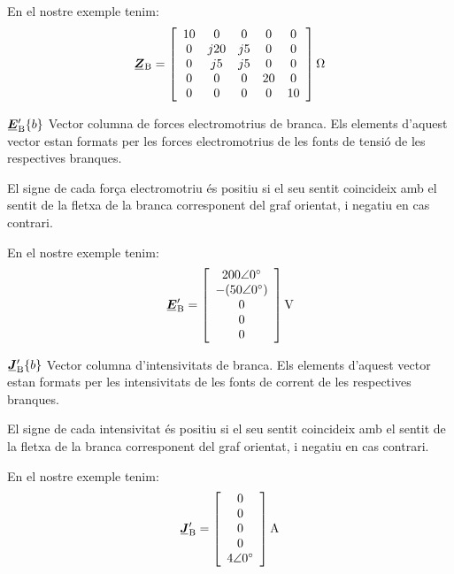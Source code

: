 \begin{list}{}
   En el nostre exemple tenim:
   \[
      \mcmplx{Z}\ped{B} = 
      \begin{bmatrix}\begin{array}{ccccc} 
            10 & 0 & 0 & 0 & 0 \\
            0 & j 20 & j 5 & 0 & 0 \\
            0 & j 5 & j 5 & 0 & 0 \\
            0 & 0 & 0 & 20 & 0 \\
            0 & 0 & 0 & 0 & 10
      \end{array}\end{bmatrix}\unit{\ohm}
   \]

   \item[$\mcmplx{E}'\ped{B}\{b\}$] Vector columna de forces electromotrius de branca. Els elements d'aquest vector estan formats per les forces electromotrius de les fonts de tensió de les respectives branques.

El signe de cada força electromotriu és positiu si el seu sentit coincideix amb el sentit de la fletxa de la branca corresponent del graf orientat, i negatiu en cas contrari.

   En el nostre exemple tenim:
   \[
      \mcmplx{E}'\ped{B} = 
      \begin{bmatrix}\begin{array}{c}  
      	\complexnum{200:0} \\ -(\complexnum{50:0}) \\ 0 \\ 0 \\ 0 
      \end{array}\end{bmatrix}\unit{V}
   \]

   \item[$\mcmplx{J}'\ped{B}\{b\}$]  Vector columna d'intensivitats de branca. Els elements d'aquest vector estan formats per les intensivitats de les fonts de corrent de les respectives branques.

El signe de cada intensivitat és positiu si el seu sentit coincideix amb el sentit de la fletxa de la branca corresponent del graf orientat, i negatiu en cas contrari.

   En el nostre exemple tenim:
   \[
      \mcmplx{J}'\ped{B} = 
      \begin{bmatrix}\begin{array}{c}  
      	0 \\ 0 \\ 0 \\ 0 \\ \complexnum{4:0} 
      \end{array}\end{bmatrix}\unit{A}
   \]

\end{list}

